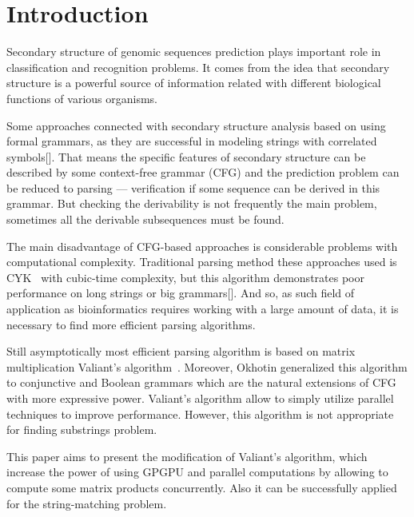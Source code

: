 \section{\bf Introduction}

Secondary structure of genomic sequences prediction plays important role in classification and recognition problems. It comes from the idea that secondary structure is a powerful source of information  related with different biological functions of various organisms.

Some approaches connected with secondary structure analysis based on using formal grammars, as they are successful in modeling strings with correlated symbols[]. 
That means the specific features of secondary structure can be described by some context-free grammar (CFG) and the prediction problem can be reduced to parsing --- verification if some sequence can be derived in this grammar. 
But checking the derivability is not frequently the main problem, sometimes all the derivable subsequences must be found.

The main disadvantage of CFG-based approaches is considerable problems with computational complexity. 
Traditional parsing method these approaches used is \linebreak CYK~\cite{Kas, Younger:1966:CLP:1441427.1442019} with cubic-time complexity, but this algorithm demonstrates poor performance on long strings or big grammars[]. 
And so, as such field of application as bioinformatics requires working with a large amount of data, it is necessary to find more efficient parsing algorithms. 

Still asymptotically most efficient parsing algorithm is based on matrix multiplication Valiant's algorithm~\cite{Valiant:1975:GCR:1739932.1740048}.
Moreover, Okhotin generalized this algorithm to conjunctive and Boolean grammars which are the natural extensions of CFG with more expressive power. 
Valiant’s algorithm allow to simply utilize parallel techniques to improve performance.
However, this algorithm is not appropriate for finding substrings problem.

This paper aims to present the modification of Valiant's algorithm, which increase the power of using GPGPU and parallel computations by allowing to compute some matrix products concurrently. 
Also it can be successfully applied for the string-matching problem.
